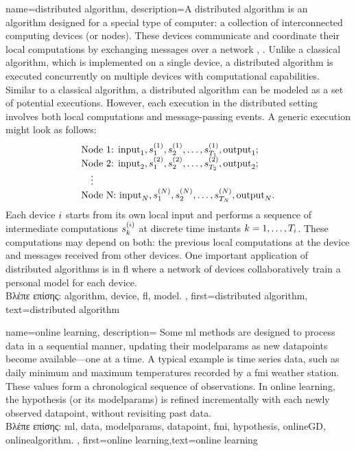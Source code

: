 {name={distributed algorithm},
	description={A distributed \gls{algorithm} is an \gls{algorithm} designed for 
		a special type of computer: a collection of interconnected computing devices (or nodes). 
		These devices communicate and coordinate their local computations by exchanging 
		messages over a network \cite{IntroDistAlg}, \cite{ParallelDistrBook}. Unlike a classical \gls{algorithm}, 
		which is implemented on a single \gls{device}, a distributed \gls{algorithm} is 
		executed concurrently on multiple \gls{device}s with computational capabilities. 
		Similar to a classical \gls{algorithm}, a distributed \gls{algorithm} can be modeled as a 
		set of potential executions. However, each execution in the distributed setting involves 
		both local computations and message-passing events. A generic execution might look as 
		follows:
		\[
		\begin{array}{l}
			\text{Node 1: } {\rm input}_1, s_1^{(1)}, s_2^{(1)}, \ldots, s_{T_1}^{(1)}, {\rm output}_1; \\
			\text{Node 2: } {\rm input}_2, s_1^{(2)}, s_2^{(2)}, \ldots, s_{T_2}^{(2)}, {\rm output}_2; \\
			\quad \vdots \\
			\text{Node N: } {\rm input}_N, s_1^{(N)}, s_2^{(N)}, \ldots, s_{T_N}^{(N)}, {\rm output}_N.
		\end{array}
		\]
		Each \gls{device} $i$ starts from its own local input and performs a sequence of 
		intermediate computations $s_{k}^{(i)}$ at discrete time instants $k = 1, \dots, T_i$. 
		These computations may depend on both: the previous local computations at the \gls{device} 
		and messages received from other \gls{device}s. One important application of distributed 
		\gls{algorithm}s is in \gls{fl} where a network of \gls{device}s collaboratively train a personal \gls{model} 
		for each \gls{device}.\\
		\foreignlanguage{greek}{Βλέπε επίσης:} \gls{algorithm}, \gls{device}, \gls{fl}, \gls{model}.
		},
	first={distributed algorithm}, text={distributed algorithm}
}

{name={online learning},
	description={
		Some \gls{ml} methods  are designed to process \gls{data} in a sequential 
		manner, updating their \gls{modelparams} as new \gls{datapoint}s become available—one at a time. 
		A typical example is time series data, such as daily minimum and maximum temperatures 
		recorded by a \gls{fmi} weather station. These values form a chronological sequence 
		of observations. In online learning, the \gls{hypothesis} (or its \gls{modelparams}) is refined 
		incrementally with each newly observed \gls{datapoint}, without revisiting past \gls{data}.  \\ 
		\foreignlanguage{greek}{Βλέπε επίσης:} \gls{ml}, \gls{data}, \gls{modelparams}, \gls{datapoint}, \gls{fmi}, \gls{hypothesis}, \gls{onlineGD}, \gls{onlinealgorithm}.  
	},
	first={online learning},text={online learning} 
}


